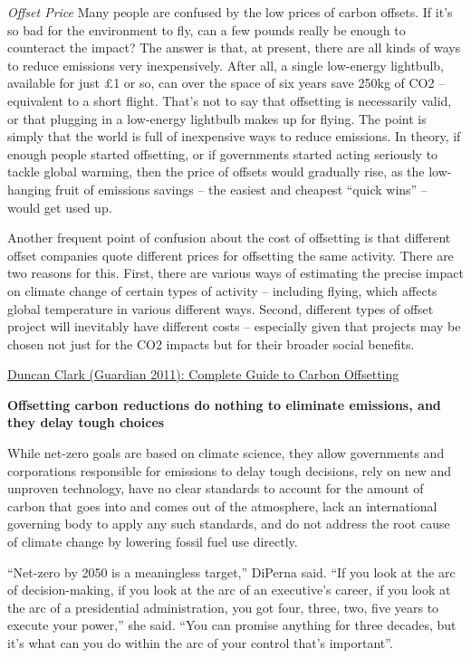 \documentclass[
]{book}
\begin{document}
\emph{Offset Price}
Many people are confused by the low prices of carbon offsets. If it's so bad for the environment to fly, can a few pounds really be enough to counteract the impact? The answer is that, at present, there are all kinds of ways to reduce emissions very inexpensively. After all, a single low-energy lightbulb, available for just £1 or so, can over the space of six years save 250kg of CO2 -- equivalent to a short flight. That's not to say that offsetting is necessarily valid, or that plugging in a low-energy lightbulb makes up for flying. The point is simply that the world is full of inexpensive ways to reduce emissions. In theory, if enough people started offsetting, or if governments started acting seriously to tackle global warming, then the price of offsets would gradually rise, as the low-hanging fruit of emissions savings -- the easiest and cheapest ``quick wins'' -- would get used up.

Another frequent point of confusion about the cost of offsetting is that different offset companies quote different prices for offsetting the same activity. There are two reasons for this. First, there are various ways of estimating the precise impact on climate change of certain types of activity -- including flying, which affects global temperature in various different ways. Second, different types of offset project will inevitably have different costs -- especially given that projects may be chosen not just for the CO2 impacts but for their broader social benefits.

\href{https://www.theguardian.com/environment/2011/sep/16/carbon-offset-projects-carbon-emissions\#:~:text=Carbon\%20offset\%20schemes\%20allow\%20individuals,designed\%20to\%20reduce\%20future\%20emissions.}{Duncan Clark (Guardian 2011): Complete Guide to Carbon Offsetting}

\textbf{Offsetting carbon reductions do nothing to eliminate emissions, and they delay tough choices}

While net-zero goals are based on climate science, they allow governments and corporations responsible for emissions to delay tough decisions, rely on new and unproven technology, have no clear standards to account for the amount of carbon that goes into and comes out of the atmosphere, lack an international governing body to apply any such standards, and do not address the root cause of climate change by lowering fossil fuel use directly.

``Net-zero by 2050 is a meaningless target,'' DiPerna said. ``If you look at the arc of decision-making, if you look at the arc of an executive's career, if you look at the arc of a presidential administration, you got four, three, two, five years to execute your power,'' she said. ``You can promise anything for three decades, but it's what can you do within the arc of your control that's important''.
\end{document}
